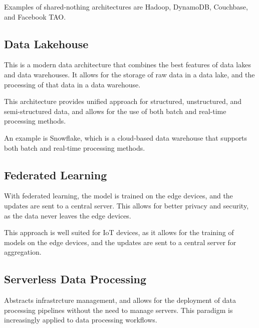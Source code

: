 Examples of shared-nothing architectures are Hadoop, DynamoDB, Couchbase, and Facebook TAO.

\subsection{Data Lakehouse}

This is a modern data architecture that combines the best features of data lakes and data warehouses. It allows for the storage of raw data in a data lake, and the processing of that data in a data warehouse.

This architecture provides unified approach for structured, unstructured, and semi-structured data, and allows for the use of both batch and real-time processing methods.

An example is Snowflake, which is a cloud-based data warehouse that supports both batch and real-time processing methods.

\subsection{Federated Learning}

With federated learning, the model is trained on the edge devices, and the updates are sent to a central server. This allows for better privacy and security, as the data never leaves the edge devices.

This approach is well suited for IoT devices, as it allows for the training of models on the edge devices, and the updates are sent to a central server for aggregation.

\subsection{Serverless Data Processing}
Abstracts infrastrcture management, and allows for the deployment of data processing pipelines without the need to manage servers.
This paradigm is increasingly applied to data
processing workflows.
